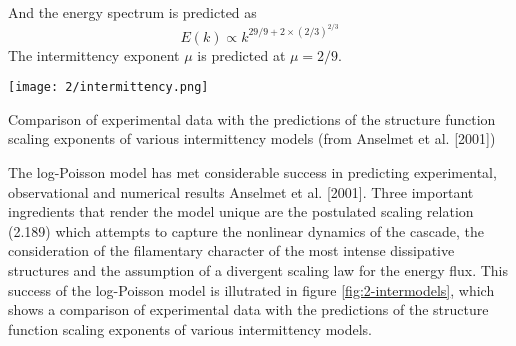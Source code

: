 And the energy spectrum is predicted as
\begin{equation}
    E(k)\propto k^{29/9+2\times(2/3)^{2/3}}
\end{equation}
The intermittency exponent $\mu$ is predicted at $\mu=2/9$. 
\begin{marginfigure}
\texttt{[image: 2/intermittency.png]}
\caption{Comparison of experimental data with the predictions of the structure function scaling exponents of various intermittency models (from Anselmet et al. [2001])}
\label{fig:2-intermodels}
\end{marginfigure}
The log-Poisson model has met considerable success in predicting experimental, observational and numerical results Anselmet et al. [2001]. Three important ingredients that render the model unique are the postulated scaling relation (2.189) which attempts to capture the nonlinear dynamics of the cascade, the consideration of the filamentary character of the most intense dissipative structures and the assumption of a divergent scaling law for the energy flux. This success of the log-Poisson model is illutrated in figure \ref{fig:2-intermodels}, which shows a comparison of experimental data with the predictions of the structure function scaling exponents of various intermittency models.


